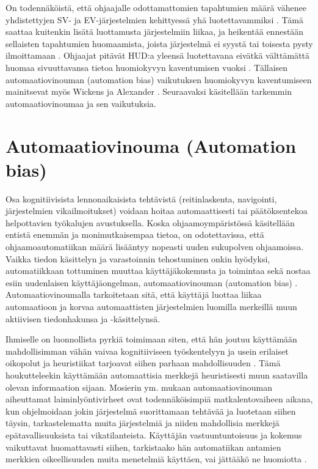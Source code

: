 \documentclass[utf8,bachelor,manualbib]{gradu3}
\begin{document}
On todennäköistä, että ohjaajalle odottamattomien tapahtumien määrä vähenee yhdistettyjen SV- ja EV-järjestelmien kehittyessä yhä luotettavammiksi \citep{kornym2009}. Tämä saattaa kuitenkin lisätä luottamusta järjestelmiin liikaa, ja heikentää ennestään sellaisten tapahtumien huomaamista, joista järjestelmä ei syystä tai toisesta pysty ilmoittamaan \citep{molloyparasuraman1996}. Ohjaajat pitävät HUD:a yleensä luotettavana eivätkä välttämättä huomaa sivuuttavansa tietoa huomiokyvyn kaventumisen vuoksi \citep{crawfordneal2006}. Tällaisen automaatiovinouman (automation bias) \citep{mosierym1998} vaikutuksen huomiokyvyn kaventumiseen mainitsevat myös Wickens ja Alexander \citeyearpar{wickensalexander2009}. Seuraavaksi käsitellään tarkemmin automaatiovinoumaa ja sen vaikutuksia.

\section{Automaatiovinouma (Automation bias)}

Osa kognitiivisista lennonaikaisista tehtävistä (reitinlaskenta, navigointi, järjestelmien vikailmoitukset) voidaan hoitaa automaattisesti tai päätöksentekoa helpottavien työkalujen avustuksella. Koska ohjaamoympäristössä käsitellään entistä enemmän ja monimutkaisempaa tietoa, on odotettavissa, että ohjaamoautomatiikan määrä lisääntyy nopeasti uuden sukupolven ohjaamoissa. Vaikka tiedon käsittelyn ja varastoinnin tehostuminen onkin hyödyksi, automatiikkaan tottuminen muuttaa käyttäjäkokemusta ja toimintaa sekä nostaa esiin uudenlaisen käyttäjäongelman, automaatiovinouman (automation bias) \citep{mosierym1998}. Automaatiovinoumalla tarkoitetaan sitä, että käyttäjä luottaa liikaa automaatioon ja korvaa automaattisten järjestelmien luomilla merkeillä muun aktiivisen tiedonhakunsa ja -käsittelynsä.

Ihmiselle on luonnollista pyrkiä toimimaan siten, että hän joutuu käyttämään mahdollisimman vähän vaivaa kognitiiviseen työskentelyyn ja usein erilaiset oikopolut ja heuristiikat tarjoavat siihen parhaan mahdollisuuden \citep{fisketaylor1994}. Tämä houkutteleekin käyttämään automaattisia merkkejä heuristisesti muun saatavilla olevan informaation sijaan. Mosierin ym. \citeyearpar{mosierym1994} mukaan automaatiovinouman aiheuttamat laiminlyöntivirheet ovat todennäköisimpiä matkalentovaiheen aikana, kun ohjelmoidaan jokin järjestelmä suorittamaan tehtävää ja luotetaan siihen täysin, tarkastelematta muita järjestelmiä ja niiden  mahdollisia merkkejä epätavallisuuksista tai vikatilanteista. Käyttäjän vastuuntuntoisuus ja kokemus vaikuttavat huomattavasti siihen, tarkistaako hän automatiikan antamien merkkien oikeellisuuden muita menetelmiä käyttäen, vai jättääkö ne huomiotta \citep{mosierym1998}.
\end{document}
